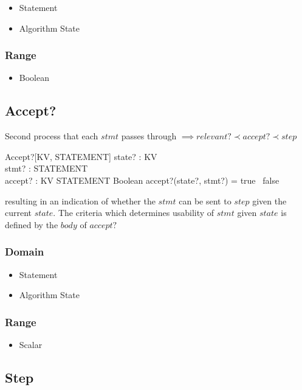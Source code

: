 \documentclass[../main.tex]{subfiles}
\begin{document}
\begin{itemize}
\item Statement
\item Algorithm State
\end{itemize}

\subsubsection{Range}

\begin{itemize}
\item Boolean
\end{itemize}

\subsection{Accept?}

Second process that each $stmt$ passes through $\implies relevant? \prec accept? \prec step$
\begin{schema}{Accept?[KV, STATEMENT]}
  state? : KV \\
  stmt? : STATEMENT \\
  accept? : KV \cross STATEMENT \fun Boolean
  \where
  accept?(state?, stmt?) = true ~\lor false
\end{schema}
resulting in an indication of whether the $stmt$ can be sent to $step$ given the current $state$.
The criteria which determines usability of $stmt$ given $state$ is defined by the $body$ of $accept?$


\subsubsection{Domain}

\begin{itemize}
\item Statement
\item Algorithm State
\end{itemize}

\subsubsection{Range}

\begin{itemize}
\item Scalar
\end{itemize}

\subsection{Step}
\end{document}
